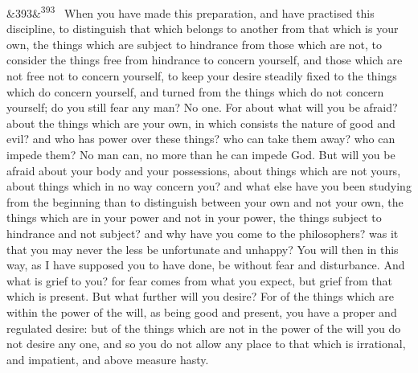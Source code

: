 \documentclass[12pt]{article}
\newcommand{\para}[1][]{\par\noindent\ifx&#1&\else\textsuperscript{\footnotesize #1}~\fi}
\begin{document}
\para[393] When you have made this preparation, and have practised this discipline, to distinguish that which belongs to another from that which is your own, the things which are subject to hindrance from those which are not, to consider the things free from hindrance to concern yourself, and those which are not free not to concern yourself, to keep your desire steadily fixed to the things which do concern yourself, and turned from the things which do not concern yourself; do you still fear any man? No one. For about what will you be afraid? about the things which are your own, in which consists the nature of good and evil? and who has power over these things? who can take them away? who can impede them? No man can, no more than he can impede God. But will you be afraid about your body and your possessions, about things which are not yours, about things which in no way concern you? and what else have you been studying from the beginning than to distinguish between your own and not your own, the things which are in your power and not in your power, the things subject to hindrance and not subject? and why have you come to the philosophers? was it that you may never the less be unfortunate and unhappy? You will then in this way, as I have supposed you to have done, be without fear and disturbance. And what is grief to you? for fear comes from what you expect, but grief from that which is present. But what further will you desire? For of the things which are within the power of the will, as being good and present, you have a proper and regulated desire: but of the things which are not in the power of the will you do not desire any one, and so you do not allow any place to that which is irrational, and impatient, and above measure hasty.
\end{document}
